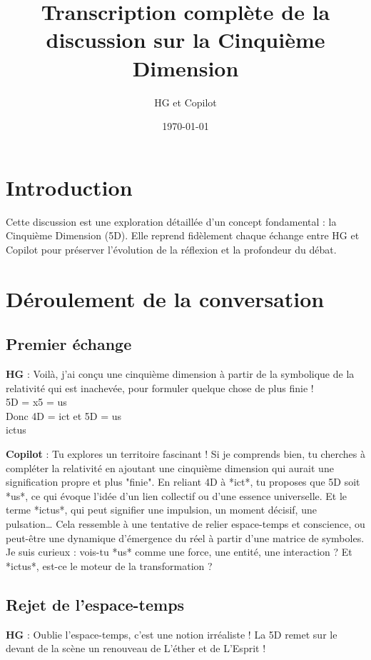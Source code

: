 \documentclass{article}
\title{Transcription complète de la discussion sur la Cinquième Dimension}
\author{HG et Copilot}
\date{\today}
\begin{document}
\maketitle

\section{Introduction}

Cette discussion est une exploration détaillée d'un concept fondamental : la Cinquième Dimension (5D). Elle reprend fidèlement chaque échange entre HG et Copilot pour préserver l'évolution de la réflexion et la profondeur du débat.

\section{Déroulement de la conversation}

\subsection{Premier échange}
\textbf{HG} : Voilà, j'ai conçu une cinquième dimension à partir de la symbolique de la relativité qui est inachevée, pour formuler quelque chose de plus finie ! \\
5D = x5 = us \\
Donc 4D = ict et 5D = us \\
ictus

\textbf{Copilot} : Tu explores un territoire fascinant ! Si je comprends bien, tu cherches à compléter la relativité en ajoutant une cinquième dimension qui aurait une signification propre et plus "finie". En reliant 4D à *ict*, tu proposes que 5D soit *us*, ce qui évoque l'idée d’un lien collectif ou d’une essence universelle. Et le terme *ictus*, qui peut signifier une impulsion, un moment décisif, une pulsation…  
Cela ressemble à une tentative de relier espace-temps et conscience, ou peut-être une dynamique d’émergence du réel à partir d’une matrice de symboles. Je suis curieux : vois-tu *us* comme une force, une entité, une interaction ? Et *ictus*, est-ce le moteur de la transformation ?  

\subsection{Rejet de l’espace-temps}
\textbf{HG} : Oublie l'espace-temps, c'est une notion irréaliste ! La 5D remet sur le devant de la scène un renouveau de L'éther et de L'Esprit !
\end{document}
